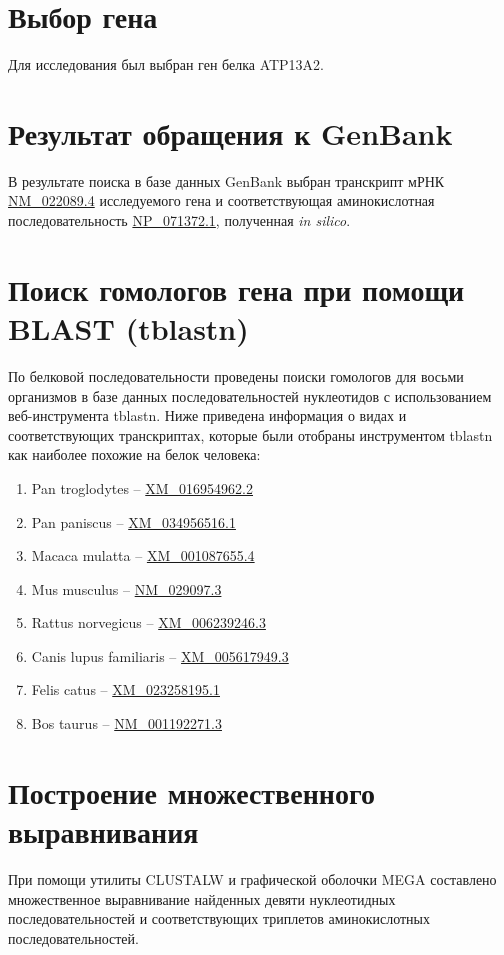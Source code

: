 \documentclass[a4paper,12pt]{article} %
\begin{document}
	
	
	\section{Выбор гена}
	Для исследования был выбран ген белка ATP13A2.
	\section{Результат обращения к GenBank}
	В результате поиска в базе данных GenBank выбран транскрипт мРНК \href{https://www.ncbi.nlm.nih.gov/nuccore/NM_022089.4}{NM\_022089.4} исследуемого гена и соответствующая аминокислотная последовательность \href{https://www.ncbi.nlm.nih.gov/protein/13435129}{NP\_071372.1}, полученная \textit{in silico}.
	\section{Поиск гомологов гена при помощи BLAST (tblastn)}
	По белковой последовательности проведены поиски гомологов для восьми организмов в базе данных последовательностей нуклеотидов с использованием веб-инструмента tblastn. Ниже приведена информация о видах и соответствующих транскриптах, которые были отобраны инструментом tblastn как наиболее похожие на белок человека:
	\begin{enumerate}
		\item Pan troglodytes -- \href{https://www.ncbi.nlm.nih.gov/nuccore/XM_016954962.2}{XM\_016954962.2} 
		\item Pan paniscus -- \href{https://www.ncbi.nlm.nih.gov/nuccore/XM_034956516.1}{XM\_034956516.1} 
		\item Macaca mulatta -- \href{https://www.ncbi.nlm.nih.gov/nuccore/XM_001087655.4}{XM\_001087655.4}
		\item Mus musculus -- \href{https://www.ncbi.nlm.nih.gov/nuccore/NM_029097.3}{NM\_029097.3}
		\item Rattus norvegicus -- \href{https://www.ncbi.nlm.nih.gov/nuccore/XM_006239246.3}{XM\_006239246.3}
		\item Canis lupus familiaris -- \href{https://www.ncbi.nlm.nih.gov/nuccore/XM_005617949.3}{XM\_005617949.3}
		\item Felis catus -- \href{https://www.ncbi.nlm.nih.gov/nuccore/XM_023258195.1}{XM\_023258195.1}
		\item Bos taurus -- \href{https://www.ncbi.nlm.nih.gov/nuccore/NM_001192271.3}{NM\_001192271.3}
	\end{enumerate}
	\section{Построение множественного выравнивания}
	При помощи утилиты CLUSTALW и графической оболочки MEGA составлено множественное выравнивание найденных девяти нуклеотидных последовательностей и соответствующих триплетов аминокислотных последовательностей.
\end{document}
